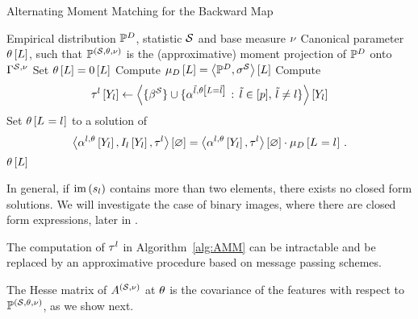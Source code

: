 \begin{algorithm}[h!]
    \caption{Alternating Moment Matching for the Backward Map}\label{alg:AMM}
    \begin{algorithmic}
        \Require Empirical distribution $\mathbb{P}^{D}$, statistic $\mathcal{S}$ and base measure $\nu$
        \Ensure Canonical parameter $\theta\left[L\right]$, such that $\mathbb{P}^{(\mathcal{S},\theta,\nu)}$ is the (approximative) moment projection of $\mathbb{P}^{D}$ onto $\Gamma^{\mathcal{S},\nu}$
        \iosepline
        \State Set $\theta\left[L\right]=0\left[L\right]$
        \State Compute $\mu_{D}\left[L\right]= \left\langle \mathbb{P}^{D},\sigma^{\mathcal{S}}\right\rangle \left[ L \right]$
            \ForAll{$\selindexin$}
                \State Compute
                \begin{align*}
                    \tau^{l}\left[Y_{l}\right]
                    \leftarrow \left\langle \{\beta^{\mathcal{S}}\}\cup\{\alpha^{\tilde{l},\theta\left[L=\tilde{l}\right]} \,:\, \tilde{l} \in [p] ,\, \tilde{l}\neq l\}\right\rangle \left[ Y_{l} \right]
                \end{align*}
                \State Set $\theta\left[L_{}=l_{}\right]$ to a solution of
                \begin{align*}
                    \left\langle \alpha^{l,\theta}\left[Y_{l}\right],I_{l}\left[Y_{l}\right],\tau^{l}\right\rangle \left[ \varnothing \right]
                    = \left\langle \alpha^{l,\theta}\left[Y_{l}\right],\tau^{l}\right\rangle \left[ \varnothing \right] \cdot \mu_{D}\left[L_{}=l_{}\right] \, .
                \end{align*}
            \EndFor
        \EndWhile
        \State \Return $\theta\left[L\right]$
    \end{algorithmic}
\end{algorithm}


% 
In general, if $\mathrm{im}\left(s_{l}\right)$ contains more than two elements, there exists no closed form solutions.
We will investigate the case of binary images, where there are closed form expressions, later in .

%
The computation of $\tau^{l}$ in Algorithm~\ref{alg:AMM} can be intractable and be replaced by an approximative procedure based on message passing schemes.


The Hesse matrix of $A^{(\mathcal{S},\nu)}$ at $\theta$ is the covariance of the features with respect to $\mathbb{P}^{(\mathcal{S},\theta,\nu)}$, as we show next.

